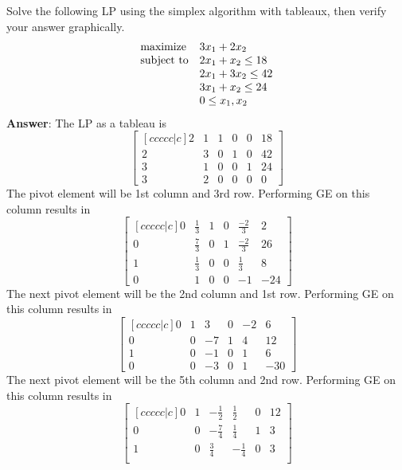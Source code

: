 \documentclass[12pt]{article}
\newenvironment{exercise}[2][Exercise]{\begin{trivlist}
		\item[\hskip \labelsep {\bfseries #1}\hskip \labelsep {\bfseries #2.}]}{\end{trivlist}}
\begin{document}
	\begin{exercise}{1} Solve the following LP using the simplex algorithm with tableaux, then verify your answer graphically.
		\begin{equation*}
			\begin{array}{ll@{}ll}
				\text{maximize}  & \displaystyle 3x_1+2x_2 &\\
				\text{subject to}& \displaystyle 2x_1+x_2 \leq 18   \\
				& \displaystyle 2x_1+3x_2 \leq 42 \\
				& \displaystyle 3x_1+x_2 \leq 24 \\
				& \displaystyle 0 \leq x_1,x_2
			\end{array}
		\end{equation*}
	\textbf{Answer}: The LP as a tableau is\\
	\[\begin{bmatrix}[ccccc|c]
		2 & 1 & 1 & 0 & 0 & 18\\
		2 & 3 & 0 & 1 & 0 & 42\\
		3 & 1 & 0 & 0 & 1 & 24\\
		3 & 2 & 0 & 0 & 0 & 0
	\end{bmatrix}\]
	The pivot element will be 1st column and 3rd row. Performing GE on this column results in
	\[\begin{bmatrix}[ccccc|c]
		0 & \frac{1}{3} & 1 & 0 & \frac{-2}{3} & 2\\
		0 & \frac{7}{3} & 0 & 1 & \frac{-2}{3} & 26\\
		1 & \frac{1}{3} & 0 & 0 & \frac{1}{3} & 8\\
		0 & 1 & 0 & 0 & -1 & -24
	\end{bmatrix}\]
	The next pivot element will be the 2nd column and 1st row. Performing GE on this column results in
	\[\begin{bmatrix}[ccccc|c]
		0 & 1 & 3 & 0 & -2 & 6\\
		0 & 0 & -7 & 1 & 4 & 12\\
		1 & 0 & -1 & 0 & 1 & 6\\
		0 & 0 & -3 & 0 & 1 & -30
	\end{bmatrix}\]
	The next pivot element will be the 5th column and 2nd row. Performing GE on this column results in
	\[\begin{bmatrix}[ccccc|c]
		0 & 1 & -\frac{1}{2} & \frac{1}{2} & 0 & 12\\
		0 & 0 & -\frac{7}{4} & \frac{1}{4} & 1 & 3\\
		1 & 0 & \frac{3}{4} & -\frac{1}{4} & 0 & 3\\

\end{bmatrix}\]
\end{exercise}
\end{document}
